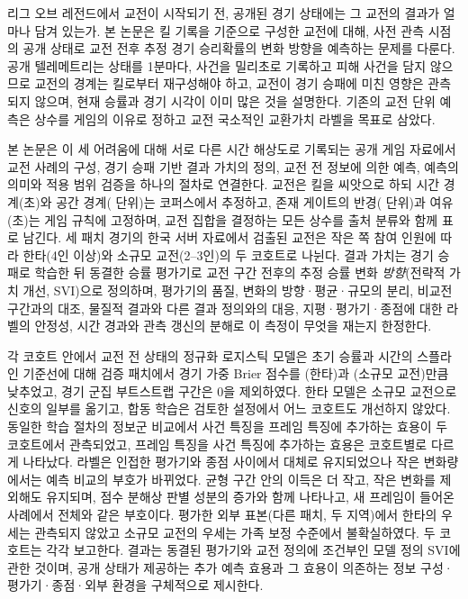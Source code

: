 \begin{abstractko}
리그 오브 레전드에서 교전이 시작되기 전, 공개된 경기 상태에는 그 교전의 결과가 얼마나 담겨 있는가. 본 논문은 킬 기록을 기준으로 구성한 교전에 대해, 사전 관측 시점의 공개 상태로 교전 전후 추정 경기 승리확률의 변화 방향을 예측하는 문제를 다룬다. 공개 텔레메트리는 상태를 1분마다, 사건을 밀리초로 기록하고 피해 사건을 담지 않으므로 교전의 경계는 킬로부터 재구성해야 하고, 교전이 경기 승패에 미친 영향은 관측되지 않으며, 현재 승률과 경기 시각이 이미 많은 것을 설명한다. 기존의 교전 단위 예측은 상수를 게임의 이유로 정하고 교전 국소적인 교환가치 라벨을 목표로 삼았다.

본 논문은 이 세 어려움에 대해 서로 다른 시간 해상도로 기록되는 공개 게임 자료에서 교전 사례의 구성, 경기 승패 기반 결과 가치의 정의, 교전 전 정보에 의한 예측, 예측의 의미와 적용 범위 검증을 하나의 절차로 연결한다. 교전은 킬을 씨앗으로 하되 시간 경계(\constG{}초)와 공간 경계(\constD{} 단위)는 코퍼스에서 추정하고, 존재 게이트의 반경(\constR{} 단위)과 여유(\constB{}초)는 게임 규칙에 고정하며, 교전 집합을 결정하는 모든 상수를 출처 분류와 함께 표로 남긴다. 세 패치 \numMatchesTotal{} 경기의 한국 서버 자료에서 검출된 교전은 작은 쪽 참여 인원에 따라 한타(4인 이상)와 소규모 교전(2--3인)의 두 코호트로 나뉜다. 결과 가치는 경기 승패로 학습한 뒤 동결한 승률 평가기로 교전 구간 전후의 추정 승률 변화 \emph{방향}(전략적 가치 개선, SVI)으로 정의하며, 평가기의 품질, 변화의 방향·평균·규모의 분리, 비교전 구간과의 대조, 물질적 결과와 다른 결과 정의와의 대응, 지평·평가기·종점에 대한 라벨의 안정성, 시간 경과와 관측 갱신의 분해로 이 측정이 무엇을 재는지 한정한다.

각 코호트 안에서 교전 전 상태의 정규화 로지스틱 모델은 초기 승률과 시간의 스플라인 기준선에 대해 검증 패치에서 경기 가중 Brier 점수를 \dBrierT{}(한타)과 \dBrierS{}(소규모 교전)만큼 낮추었고, 경기 군집 부트스트랩 구간은 0을 제외하였다. 한타 모델은 소규모 교전으로 신호의 일부를 옮기고, 합동 학습은 검토한 설정에서 어느 코호트도 개선하지 않았다. 동일한 학습 절차의 정보군 비교에서 사건 특징을 프레임 특징에 추가하는 효용이 두 코호트에서 관측되었고, 프레임 특징을 사건 특징에 추가하는 효용은 코호트별로 다르게 나타났다. 라벨은 인접한 평가기와 종점 사이에서 대체로 유지되었으나 작은 변화량에서는 예측 비교의 부호가 바뀌었다. 균형 구간 안의 이득은 더 작고, 작은 변화를 제외해도 유지되며, 점수 분해상 판별 성분의 증가와 함께 나타나고, 새 프레임이 들어온 사례에서 전체와 같은 부호이다. 평가한 외부 표본(다른 패치, 두 지역)에서 한타의 우세는 관측되지 않았고 소규모 교전의 우세는 가족 보정 수준에서 불확실하였다. 두 코호트는 각각 보고한다. 결과는 동결된 평가기와 교전 정의에 조건부인 모델 정의 SVI에 관한 것이며, 공개 상태가 제공하는 추가 예측 효용과 그 효용이 의존하는 정보 구성·평가기·종점·외부 환경을 구체적으로 제시한다.
\end{abstractko}
